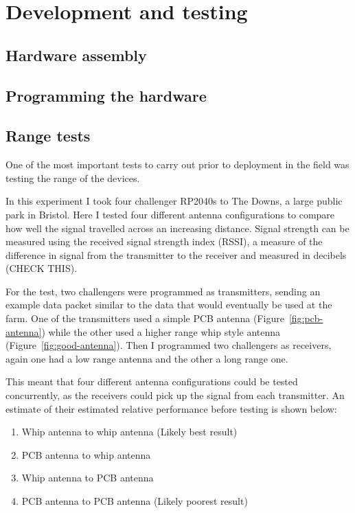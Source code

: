 \section{Development and testing}

\subsection{Hardware assembly}

\subsection{Programming the hardware}

\subsection{Range tests}

One of the most important tests to carry out prior to deployment in the field
was testing the range of the devices.

In this experiment I took four challenger RP2040s to The Downs, a large public
park in Bristol. Here I tested four different antenna configurations to compare
how well the signal travelled across an increasing distance. Signal strength can
be measured using the received signal strength index (RSSI), a measure of the
difference in signal from the transmitter to the receiver and measured in
decibels (CHECK THIS).

For the test, two challengers were programmed as transmitters, sending an
example data packet similar to the data that would eventually be used at the
farm. One of the transmitters used a simple PCB antenna
(Figure~\ref{fig:pcb-antenna}) while the other used a higher range whip style
antenna (Figure~\ref{fig:good-antenna}). Then I programmed two challengers as
receivers, again one had a low range antenna and the other a long range one.

This meant that four different antenna configurations could be tested
concurrently, as the receivers could pick up the signal from each transmitter.
An estimate of their estimated relative performance before testing is shown
below:

\begin{enumerate}
    \item Whip antenna to whip antenna (Likely best result)
    \item PCB antenna to whip antenna
    \item Whip antenna to PCB antenna
    \item PCB antenna to PCB antenna (Likely poorest result)
\end{enumerate}


